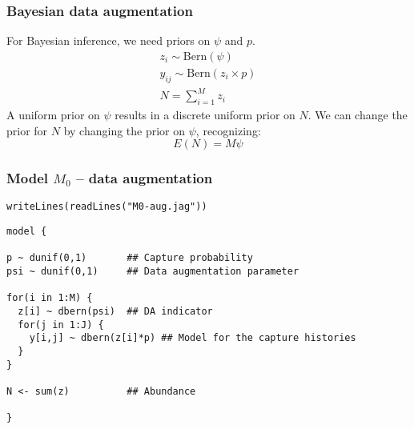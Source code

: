\documentclass[color=usenames,dvipsnames]{beamer}\usepackage[]{graphicx}\usepackage[]{color}
\makeatletter
\newcommand{\hlstr}[1]{\textcolor[rgb]{0.749,0.012,0.012}{#1}}%
\newcommand{\hlstd}[1]{\textcolor[rgb]{0,0,0}{#1}}%
\newcommand{\hlkwd}[1]{\textcolor[rgb]{0.004,0.004,0.506}{#1}}%
\newenvironment{kframe}{%
 \def\at@end@of@kframe{}%
 \ifinner\ifhmode%
  \def\at@end@of@kframe{\end{minipage}}%
  \begin{minipage}{\columnwidth}%
 \fi\fi%
 \def\FrameCommand##1{\hskip\@totalleftmargin \hskip-\fboxsep
 \colorbox{shadecolor}{##1}\hskip-\fboxsep
     \hskip-\linewidth \hskip-\@totalleftmargin \hskip\columnwidth}%
 \MakeFramed {\advance\hsize-\width
   \@totalleftmargin\z@ \linewidth\hsize
   \@setminipage}}%
 {\par\unskip\endMakeFramed%
 \at@end@of@kframe}
\newenvironment{knitrout}{}{} %
\makeatother
\begin{document}






\begin{frame}
  \frametitle{Bayesian data augmentation}
  For Bayesian inference, we need priors on $\psi$ and $p$. 
  \begin{gather*}
    z_i \sim \mathrm{Bern}(\psi) \\
    y_{ij} \sim \mathrm{Bern}(z_i \times p) \\
    N = \sum_{i=1}^M z_i
  \end{gather*}
  \vfill
  A uniform prior on $\psi$ results in a discrete uniform prior on
  $N$. We can change the prior for $N$ by changing the prior on  
  $\psi$, recognizing:
  \[
    E(N)=M\psi
  \]
\end{frame}



\begin{frame}[fragile]
  \frametitle{Model $M_0$ -- data augmentation}
\vspace{-3pt}
\begin{knitrout}\footnotesize
{}\color{fgcolor}\begin{kframe}
\begin{alltt}
\hlkwd{writeLines}\hlstd{(}\hlkwd{readLines}\hlstd{(}\hlstr{"M0-aug.jag"}\hlstd{))}
\end{alltt}
\begin{verbatim}
model {

p ~ dunif(0,1)       ## Capture probability
psi ~ dunif(0,1)     ## Data augmentation parameter

for(i in 1:M) {
  z[i] ~ dbern(psi)  ## DA indicator
  for(j in 1:J) {
    y[i,j] ~ dbern(z[i]*p) ## Model for the capture histories
  }
}

N <- sum(z)          ## Abundance

}
\end{verbatim}
\end{kframe}
\end{knitrout}
\end{frame}
\end{document}
